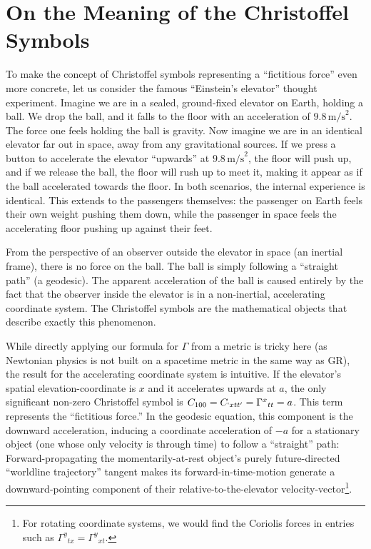 \documentclass[twocolumn]{article}
\begin{document}
\section{On the Meaning of the Christoffel Symbols}\label{app:ChristoffelPhysics}

To make the concept of Christoffel symbols representing a ``fictitious
force'' even more concrete, let us consider the famous ``Einstein's
elevator'' thought experiment. Imagine we are in a sealed, ground-fixed
elevator on Earth, holding a ball. We drop the ball, and it falls to the
floor with an acceleration of $9.8\,\text{m/s}^2$. The force one feels
holding the ball is gravity. Now imagine we are in an identical elevator
far out in space, away from any gravitational sources. If we press a
button to accelerate the elevator ``upwards'' at $9.8\,\text{m/s}^2$,
the floor will push up, and if we release the ball, the floor will rush
up to meet it, making it appear as if the ball accelerated towards the
floor. In both scenarios, the internal experience is identical. This
extends to the passengers themselves: the passenger on Earth feels their
own weight pushing them down, while the passenger in space feels the
accelerating floor pushing up against their feet.

From the perspective of an observer outside the elevator in space (an
inertial frame), there is no force on the ball. The ball is simply
following a ``straight path'' (a geodesic). The apparent acceleration of
the ball is caused entirely by the fact that the observer inside the
elevator is in a non-inertial, accelerating coordinate system. The
Christoffel symbols are the mathematical objects that describe exactly
this phenomenon.

While directly applying our formula for $\Gamma$ from a metric is
tricky here (as Newtonian physics is not built on a spacetime metric
in the same way as GR), the result for the accelerating coordinate
system is intuitive. If the elevator's spatial elevation-coordinate is
$x$ and it accelerates upwards at $a$, the only significant non-zero
Christoffel symbol is $C_{100}=C_{`xtt'}=\Gamma^x{}_{tt}=a$. This term
represents the ``fictitious force.'' In the geodesic equation, this
component is the downward acceleration, inducing a coordinate
acceleration of $-a$ for a stationary object (one whose only velocity
is through time) to follow a ``straight'' path: Forward-propagating
the momentarily-at-rest object's purely future-directed ``worldline
trajectory'' tangent makes its forward-in-time-motion generate a
downward-pointing component of their relative-to-the-elevator
velocity-vector\footnote{For rotating coordinate systems, we would find the
Coriolis forces in entries such as $\Gamma^y{}_{tx}=\Gamma^y{}_{xt}$.}.
\end{document}

